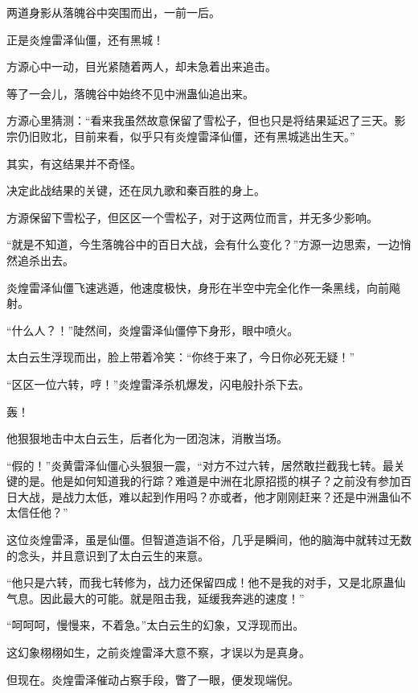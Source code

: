 
\begin{this_body}



两道身影从落魄谷中突围而出，一前一后。

正是炎煌雷泽仙僵，还有黑城！

方源心中一动，目光紧随着两人，却未急着出来追击。

等了一会儿，落魄谷中始终不见中洲蛊仙追出来。

方源心里猜测：“看来我虽然故意保留了雪松子，但也只是将结果延迟了三天。影宗仍旧败北，目前来看，似乎只有炎煌雷泽仙僵，还有黑城逃出生天。”

其实，有这结果并不奇怪。

决定此战结果的关键，还在凤九歌和秦百胜的身上。

方源保留下雪松子，但区区一个雪松子，对于这两位而言，并无多少影响。

“就是不知道，今生落魄谷中的百日大战，会有什么变化？”方源一边思索，一边悄然追杀出去。

炎煌雷泽仙僵飞速逃遁，他速度极快，身形在半空中完全化作一条黑线，向前飚射。

“什么人？！”陡然间，炎煌雷泽仙僵停下身形，眼中喷火。

太白云生浮现而出，脸上带着冷笑：“你终于来了，今日你必死无疑！”

“区区一位六转，哼！”炎煌雷泽杀机爆发，闪电般扑杀下去。

轰！

他狠狠地击中太白云生，后者化为一团泡沫，消散当场。

“假的！”炎黄雷泽仙僵心头狠狠一震，“对方不过六转，居然敢拦截我七转。最关键的是。他是如何知道我的行踪？难道是中洲在北原招揽的棋子？之前没有参加百日大战，是战力太低，难以起到作用吗？亦或者，他才刚刚赶来？还是中洲蛊仙不太信任他？”

这位炎煌雷泽，虽是仙僵。但智道造诣不俗，几乎是瞬间，他的脑海中就转过无数的念头，并且意识到了太白云生的来意。

“他只是六转，而我七转修为，战力还保留四成！他不是我的对手，又是北原蛊仙气息。因此最大的可能。就是阻击我，延缓我奔逃的速度！”

“呵呵呵，慢慢来，不着急。”太白云生的幻象，又浮现而出。

这幻象栩栩如生，之前炎煌雷泽大意不察，才误以为是真身。

但现在。炎煌雷泽催动占察手段，瞥了一眼，便发现端倪。


\end{this_body}
